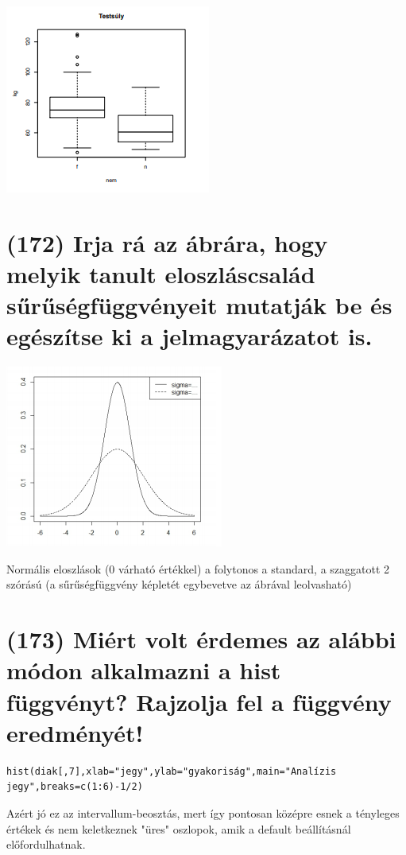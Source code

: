 \documentclass[12p]{article}
\begin{document}
\includegraphics{boxplot}

\section{(172) Irja rá az ábrára, hogy melyik tanult eloszláscsalád sűrűségfüggvényeit mutatják be és
egészítse ki a jelmagyarázatot is.}

\includegraphics{fuggveny}

 Normális eloszlások (0 várható értékkel) a folytonos a standard, a szaggatott 2 szórású
(a sűrűségfüggvény képletét egybevetve az ábrával leolvasható)


\section{(173) Miért volt érdemes az alábbi módon alkalmazni a hist függvényt? Rajzolja fel a függvény eredményét! }

\begin{verbatim}
hist(diak[,7],xlab="jegy",ylab="gyakoriság",main="Analízis
jegy",breaks=c(1:6)-1/2)
\end{verbatim}

Azért jó ez az intervallum-beosztás, mert így pontosan középre esnek a tényleges értékek
és nem keletkeznek "üres" oszlopok, amik a default beállításnál előfordulhatnak.
\end{document}
